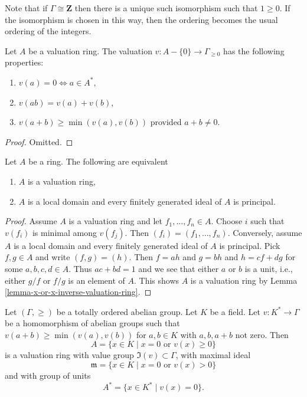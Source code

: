 \noindent
Note that if $\Gamma \cong \mathbf{Z}$ then there is a unique such
isomorphism such that $1 \geq 0$. If the isomorphism is chosen in this
way, then the ordering becomes the usual ordering of the integers.

\begin{lemma}
\label{lemma-properties-valuation}
Let $A$ be a valuation ring. The valuation $v : A -\{0\} \to \Gamma_{\geq 0}$
has the following properties:
\begin{enumerate}
\item $v(a) = 0 \Leftrightarrow a \in A^*$,
\item $v(ab) = v(a) + v(b)$,
\item $v(a + b) \geq \min(v(a), v(b))$ provided $a + b \not = 0$.
\end{enumerate}
\end{lemma}

\begin{proof}
Omitted.
\end{proof}

\begin{lemma}
\label{lemma-characterize-valuation-ring}
Let $A$ be a ring. The following are equivalent
\begin{enumerate}
\item $A$ is a valuation ring,
\item $A$ is a local domain and every finitely generated
ideal of $A$ is principal.
\end{enumerate}
\end{lemma}

\begin{proof}
Assume $A$ is a valuation ring and let $f_1, \ldots, f_n \in A$.
Choose $i$ such that $v(f_i)$ is minimal among $v(f_j)$.
Then $(f_i) = (f_1, \ldots, f_n)$. Conversely, assume $A$ is
a local domain and every finitely generated ideal of $A$ is principal.
Pick $f, g \in A$ and write $(f, g) = (h)$. Then $f = ah$ and $g = bh$
and $h = cf + dg$ for some $a, b, c, d \in A$. Thus $ac + bd = 1$
and we see that either $a$ or $b$ is a unit, i.e., either
$g/f$ or $f/g$ is an element of $A$. This shows $A$ is a valuation ring
by Lemma \ref{lemma-x-or-x-inverse-valuation-ring}.
\end{proof}

\begin{lemma}
\label{lemma-valuation-valuation-ring}
Let $(\Gamma, \geq)$ be a totally ordered abelian group.
Let $K$ be a field. Let $v : K^* \to \Gamma$ be a homomorphism
of abelian groups such that $v(a + b) \geq \min(v(a), v(b))$ for
$a, b \in K$ with $a, b, a + b$ not zero. Then
$$
A =
\{
x \in K \mid x = 0 \text{ or } v(x) \geq 0
\}
$$
is a valuation ring with value group $\Im(v) \subset \Gamma$,
with maximal ideal
$$
\mathfrak m =
\{
x \in K \mid x = 0 \text{ or } v(x) > 0
\}
$$
and with group of units
$$
A^* =
\{
x \in K^* \mid v(x) = 0
\}.
$$
\end{lemma}

